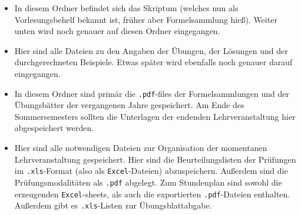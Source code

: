 \begin{itemize}
  \item {} In diesem Ordner befindet sich das
    Skriptum (welches nun als \glqq{}Vorlesungsbehelf\grqq{} bekannt ist, früher
    aber \glqq{}Formelsammlung\grqq{} hieß). Weiter unten wird noch genauer
    auf diesen Ordner eingegangen.
  \item {} Hier sind alle Dateien
    zu den Angaben der Übungen, der Lösungen und der durchgerechneten Beispiele.
    Etwas später wird ebenfalls noch genauer darauf eingegangen.
  \item {} In diesem Ordner sind primär die
    {\tt .pdf}-files der Formelsammlungen und der Übungsbätter der
    vergangenen Jahre gespeichert. Am Ende des Sommersemesters sollten die 
    Unterlagen der endenden Lehrveranstaltung hier abgespeichert werden.
   \item {} Hier sind alle
     notwendigen Dateien zur Organisation der momentanen Lehrveranstaltung 
     gespeichert. Hier sind die Beurteilungslisten der Prüfungen im
     {\tt .xls}-Format (also als {\tt Excel}-Dateien) abzuspeichern. Außerdem
     sind die Prüfungsmodalitäten als {\tt .pdf} abgelegt. Zum Stundenplan
     sind sowohl die erzeugenden {\tt Excel}-sheets, als auch die exportierten
     {\tt .pdf}-Dateien enthalten. Außerdem gibt es {\tt .xls}-Listen zur 
     Übungsblattabgabe.
\end{itemize}

